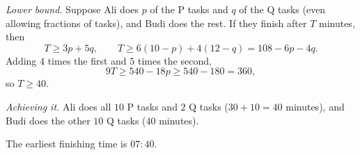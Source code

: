 \emph{Lower bound.} Suppose Ali does $p$ of the P tasks and $q$ of the Q tasks (even allowing fractions of tasks), and Budi does the rest. If they finish after $T$ minutes, then
\[T\ge3p+5q,\qquad T\ge6(10-p)+4(12-q)=108-6p-4q.\]
Adding $4$ times the first and $5$ times the second,
\[9T\ge540-18p\ge540-180=360,\]
so $T\ge40$.

\emph{Achieving it.} Ali does all $10$ P tasks and $2$ Q tasks ($30+10=40$ minutes), and Budi does the other $10$ Q tasks ($40$ minutes).

The earliest finishing time is $\boxed{07{:}40}$.
